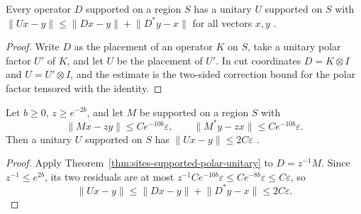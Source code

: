 \begin{theorem}
    \label{thm:sites-supported-polar-unitary}
    \leanok
    Every operator $D$ supported on a region $S$ has a unitary $U$ supported on $S$
    with $\lVert Ux-y\rVert\le\lVert Dx-y\rVert+\lVert D^*y-x\rVert$ for all
    vectors $x,y$ \cite[Section~2]{OpenAI2026PolynomialPEPS}.
\end{theorem}
\begin{proof}
    \leanok
    Write $D$ as the placement of an operator $K$ on $S$, take a unitary polar
    factor $U'$ of $K$, and let $U$ be the placement of $U'$. In cut coordinates
    $D=K\otimes I$ and $U=U'\otimes I$, and the estimate is the two-sided
    correction bound for the polar factor tensored with the identity.
\end{proof}

\begin{theorem}
    \label{thm:sites-supported-polar-step}
    \leanok
    Let $b\ge0$, $z\ge e^{-2b}$, and let $M$ be supported on a region $S$ with
    \[
        \lVert Mx-zy\rVert\le Ce^{-10b}\varepsilon,\qquad
        \lVert M^*y-zx\rVert\le Ce^{-10b}\varepsilon .
    \]
    Then a unitary $U$ supported on $S$ has $\lVert Ux-y\rVert\le2C\varepsilon$
    \cite[Section~2]{OpenAI2026PolynomialPEPS}.
\end{theorem}
\begin{proof}
    \leanok
    Apply Theorem~\ref{thm:sites-supported-polar-unitary} to $D=z^{-1}M$. Since
    $z^{-1}\le e^{2b}$, its two residuals are at most
    $z^{-1}Ce^{-10b}\varepsilon\le Ce^{-8b}\varepsilon\le C\varepsilon$, so
    \[
        \lVert Ux-y\rVert\le\lVert Dx-y\rVert+\lVert D^*y-x\rVert
        \le2C\varepsilon .
    \]
\end{proof}

